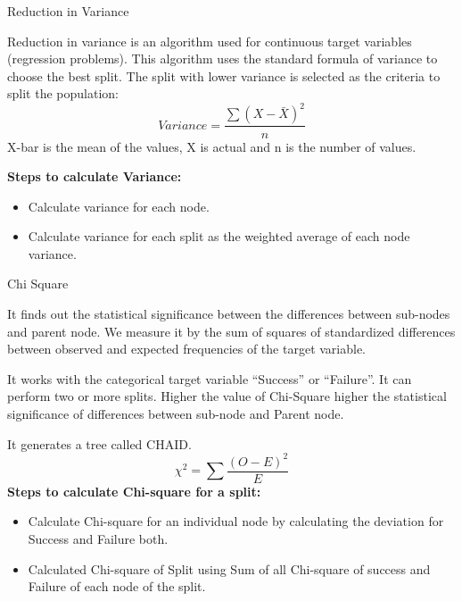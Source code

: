 \documentclass{beamer}
\begin{document}
\begin{frame}{Reduction in Variance}
\begin{flushleft}
	Reduction in variance is an algorithm used for continuous target variables (regression problems). This algorithm uses the standard formula of variance to choose the best split. The split with lower variance is selected as the criteria to split the population:
		\begin{equation*}
			Variance = \frac{\sum(X-\bar{X})^2}{n}
		\end{equation*}
X-bar is the mean of the values, X is actual and n is the number of values.

\textbf{Steps to calculate Variance:}
\begin{itemize}
	\item Calculate variance for each node.
	\item Calculate variance for each split as the weighted average of each node variance.
\end{itemize}

	\end{flushleft}
\end{frame}
\begin{frame}{Chi Square}
\begin{flushleft}
	It finds out the statistical significance between the differences between sub-nodes and parent node. We measure it by the sum of squares of standardized differences between observed and expected frequencies of the target variable.

It works with the categorical target variable “Success” or “Failure”. It can perform two or more splits. Higher the value of Chi-Square higher the statistical significance of differences between sub-node and Parent node.

It generates a tree called CHAID.
		\begin{equation*}
			\chi^2 = \sum\frac{(O-E)^2}{E}
		\end{equation*}
\textbf{Steps to calculate Chi-square for a split:}
\begin{itemize}
	\item Calculate Chi-square for an individual node by calculating the deviation for Success and Failure both.
	\item Calculated Chi-square of Split using Sum of all Chi-square of success and Failure of each node of the split.
\end{itemize}

	\end{flushleft}
\end{frame}
\end{document}
